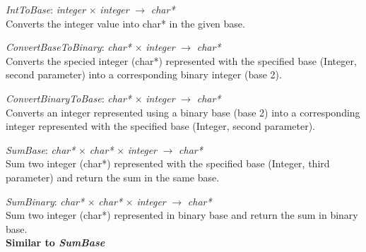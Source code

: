 \documentclass[book, backcover, english, nodocumentinfo]{upmethodology-document}
\begin{document}
		\begin{minipage}{\linewidth}
			\textit{IntToBase}: \textit{integer} $\times$ \textit{integer} $\rightarrow$ \textit{char*}\\
			Converts the integer value into char* in the given base.
			\label{algo:BNIL-IntToBase}
			
		\end{minipage}
		\nxtalgo{}

		\begin{minipage}{\linewidth}
			\textit{ConvertBaseToBinary}: \textit{char*} $\times$ \textit{integer} $\rightarrow$ \textit{char*}\\
			Converts the specied integer (char*) represented with the specified base (Integer, second parameter) into a corresponding binary integer (base 2).
			\label{algo:BNIL-ConvertBaseToBinary}
			
		\end{minipage}
		\nxtalgo{}

		\begin{minipage}{\linewidth}
			\textit{ConvertBinaryToBase}: \textit{char*} $\times$ \textit{integer} $\rightarrow$ \textit{char*}\\
			Converts an integer represented using a binary base (base 2) into a corresponding integer represented with the specified base (Integer, second parameter).
			\label{algo:BNIL-ConvertBinaryToBase}
			
		\end{minipage}
		\nxtalgo{}

		\begin{minipage}{\linewidth}
			\textit{SumBase}: \textit{char*} $\times$  \textit{char*} $\times$  \textit{integer} $\rightarrow$ \textit{char*}\\
			Sum two integer (char*) represented with the specified base (Integer, third parameter) and return the sum in the same base.
			\label{algo:BNIL-SumBase}
			
		\end{minipage}

		\begin{minipage}{\linewidth}
			\textit{SumBinary}: \textit{char*} $\times$  \textit{char*} $\times$  \textit{integer} $\rightarrow$ \textit{char*}\\
			Sum two integer (char*) represented in binary base and return the sum in binary base.
			\label{algo:BNIL-SumBinary}\\
			\textbf{Similar to \textit{SumBase}}
		\end{minipage}
\end{document}
